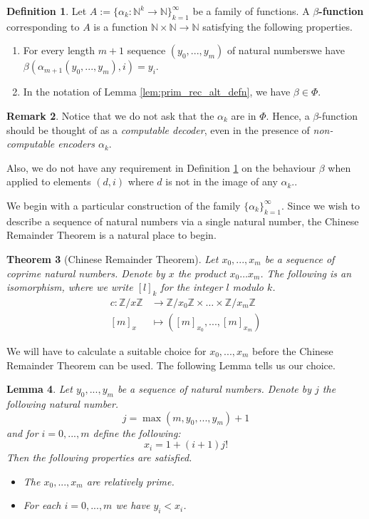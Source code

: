 \documentclass[12pt]{article}
\theoremstyle{plain}
\newtheorem{thm}{Theorem}[subsection] %
\newtheorem{lemma}[thm]{Lemma}
\theoremstyle{definition}
\newtheorem{defn}[thm]{Definition} %
\newtheorem{remark}[thm]{Remark}
\newcommand{\bb}[1]{\mathbb{#1}}
\newcommand{\lto}{\longrightarrow}
\begin{document}
	\begin{defn}\label{def:beta_function}
		Let $A := \lbrace \alpha_k: \bb{N}^{k} \lto \bb{N}\rbrace_{k = 1}^\infty$ be a family of functions. A \textbf{$\beta$-function} corresponding to $A$ is a function $\bb{N} \times \bb{N} \lto \bb{N}$ satisfying the following properties.
		\begin{enumerate}
			\item\label{beta_code} For every length $m+1$ sequence $(y_0,...,y_m)$ of natural numberswe have $\beta(\alpha_{m+1}(y_0,...,y_m),i) = y_i$.
			\item In the notation of Lemma \ref{lem:prim_rec_alt_defn}, we have $\beta \in \Phi$.
		\end{enumerate} 
	\end{defn}
	\begin{remark}
		Notice that we do not ask that the $\alpha_k$ are in $\Phi$. Hence, a $\beta$-function should be thought of as a \emph{computable decoder}, even in the presence of \emph{non-computable encoders $\alpha_k$}.
		
		Also, we do not have any requirement in Definition \ref{def:beta_function} on the behaviour $\beta$ when applied to elements $(d, i)$ where $d$ is not in the image of any $\alpha_k$..
	\end{remark}
	We begin with a particular construction of the family $\lbrace \alpha_k\rbrace_{k = 1}^\infty$. Since we wish to describe a sequence of natural numbers via a single natural number, the Chinese Remainder Theorem is a natural place to begin.
	\begin{thm}[Chinese Remainder Theorem]\label{thm:chinese}
		Let $x_0,...,x_m$ be a sequence of coprime natural numbers. Denote by $x$ the product $x_0\hdots x_m$. The following is an isomorphism, where we write $[l]_k$ for the integer $l$ modulo $k$.
		\begin{align}
			c: \bb{Z}/x\bb{Z} &\lto \bb{Z}/x_0\bb{Z} \times \hdots \times \bb{Z}/x_m\bb{Z}\\
			[m]_{x} &\longmapsto ([m]_{x_0},...,[m]_{x_m})
		\end{align}
	\end{thm}
	We will have to calculate a suitable choice for $x_0,...,x_m$ before the Chinese Remainder Theorem can be used. The following Lemma tells us our choice.
	\begin{lemma}
		Let $y_0,...,y_m$ be a sequence of natural numbers. Denote by $j$ the following natural number.
		\begin{equation}
			j = \operatorname{max}(m,y_0,...,y_m) + 1
		\end{equation}
		and for $i = 0,...,m$ define the following:
		\begin{equation}\label{eq:x}
			x_i = 1 + (i + 1)j!
		\end{equation}
		Then the following properties are satisfied.
		\begin{itemize}
			\item The $x_0,...,x_m$ are relatively prime.
			\item For each $i=0,...,m$ we have $y_i < x_i$.
		\end{itemize}
	\end{lemma}
\end{document}
